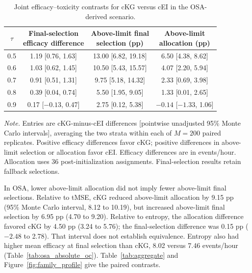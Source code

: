 \documentclass[11pt]{article}
\newcommand{\rev}[1]{{#1}}
\begin{document}
\begin{table}[H]
\centering
\footnotesize
\setlength{\tabcolsep}{3pt}
\caption{Joint efficacy--toxicity contrasts for cKG versus cEI in the OSA-derived scenario.}
\label{tab:cei_joint}
\begin{tabular}{@{}cccc@{}}
\toprule
$\tau$ & \shortstack{Final-selection\\efficacy difference} & \shortstack{Above-limit final\\selection (pp)} & \shortstack{Above-limit\\allocation (pp)} \\
\midrule
0.5 & 1.19 [0.76, 1.63] & 13.00 [6.82, 19.18] & 6.50 [4.38, 8.62] \\
0.6 & 1.03 [0.62, 1.45] & 10.50 [5.43, 15.57] & 4.07 [2.20, 5.94] \\
0.7 & 0.91 [0.51, 1.31] & 9.75 [5.18, 14.32] & 2.33 [0.69, 3.98] \\
0.8 & 0.39 [0.04, 0.74] & 5.50 [1.95, 9.05] & 1.33 [0.01, 2.65] \\
0.9 & 0.17 [$-0.13$, 0.47] & 2.75 [0.12, 5.38] & $-0.14$ [$-1.33$, 1.06] \\
\bottomrule
\end{tabular}
\vspace{3pt}
\begin{minipage}{0.98\linewidth}
\scriptsize\raggedright
\textit{Note.} Entries are cKG-minus-cEI differences [pointwise unadjusted 95\% Monte Carlo intervals], averaging the two strata within each of $M=200$ paired replicates. Positive efficacy differences favor cKG; \rev{positive differences in above-limit selection or allocation favor cEI}. \rev{Efficacy differences are in events/hour.} Allocation uses 36 post-initialization assignments. Final-selection results retain fallback selections.
\end{minipage}
\end{table}

\rev{In OSA, lower above-limit allocation did not imply fewer above-limit final selections.} Relative to tMSE, cKG reduced above-limit allocation by 9.15 \rev{pp} (95\% Monte Carlo interval, 8.12 to 10.19), but increased above-limit final selection by 6.95 \rev{pp} (4.70 to 9.20). Relative to entropy, the allocation difference favored cKG by 4.50 \rev{pp} (3.24 to 5.76); the final-selection difference was 0.15 \rev{pp} ($-2.48$ to 2.78). That interval does not establish equivalence. Entropy also had higher mean efficacy at final selection than cKG, \rev{8.02 versus 7.46 events/hour} (Table~\ref{tab:osa_absolute_oc}). Table~\ref{tab:aggregate} and Figure~\ref{fig:family_profile} give the paired contrasts.
\end{document}
